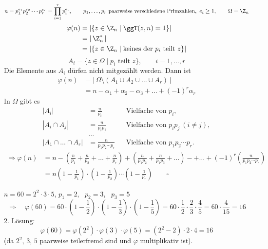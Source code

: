\begin{satz}
\[
n = p_1^{e_1} p_2^{e_2} \cdots p_r^{e_r} = \prod_{i=1}^{r} p_i^{e_i}, \qquad p_1, \dots, p_r \text{ paarweise verschiedene Primzahlen}, \ e_i \ge 1, \qquad \Omega = \Z_n
\]
\begin{align*}
\varphi(n) &= |\{ z \in \Z_n \mid \ggT(z, n) = 1 \}| \\
&= |\,\Z_n^*\,| \\
&= |\{ z \in \Z_n \mid \text{keines der } p_i \text{ teilt } z \}|
\end{align*}
\[
A_i = \{ z \in \Omega \mid p_i \text{ teilt } z \}, \qquad i = 1, \dots, r
\]
Die Elemente aus $A_i$ dürfen nicht mitgezählt werden. Dann ist
\begin{align*}
\varphi(n) &= |\,\Omega \setminus (A_1 \cup A_2 \cup \dots \cup A_r)\,| \\
&= n - \alpha_1 + \alpha_2 - \alpha_3 + \dots + (-1)^r \alpha_r
\end{align*}
In $\Omega$ gibt es
\begin{align*}
|A_i| &= \frac{n}{p_i} && \text{Vielfache von } p_i, \\
|A_i \cap A_j| &= \frac{n}{p_i p_j} && \text{Vielfache von } p_i p_j \ (i \neq j), \\
&\dots \\
|A_1 \cap \dots \cap A_r| &= \frac{n}{p_1 p_2 \cdots p_r} && \text{Vielfache von } p_1 p_2 \cdots p_r.
\end{align*}
\begin{align*}
\Rightarrow \varphi(n) &= n - \left(\frac{n}{p_1} + \frac{n}{p_2} + \dots + \frac{n}{p_r}\right) + \left(\frac{n}{p_1p_2} + \frac{n}{p_1p_3} + \dots\right) - + \dots + (-1)^r\left(\frac{n}{p_1p_2\cdots p_r}\right) \\
&= n \left(1 - \frac{1}{p_1}\right)\cdot\left(1 - \frac{1}{p_2}\right)\cdots\left(1 - \frac{1}{p_r}\right) \qquad \square
\end{align*}
\end{satz}

\begin{beispiel}
$n = 60 = 2^2 \cdot 3 \cdot 5$, \qquad $p_1 = 2$, \ $p_2 = 3$, \ $p_3 = 5$
\[
\Rightarrow \quad %
\varphi(60) = 60 \cdot \left(1 - \frac{1}{2}\right)\cdot\left(1 - \frac{1}{3}\right)\cdot\left(1 - \frac{1}{5}\right) = 60 \cdot \frac{1}{2}\cdot\frac{2}{3}\cdot\frac{4}{5} = 60 \cdot \frac{4}{15} = 16
\]
2. Lösung:
\[
\varphi(60) = \varphi(2^2) \cdot \varphi(3) \cdot \varphi(5) = (2^2 - 2) \cdot 2 \cdot 4 = 16
\]
(da $2^2$, $3$, $5$ paarweise teilerfremd sind und $\varphi$ multiplikativ ist).
\end{beispiel}

